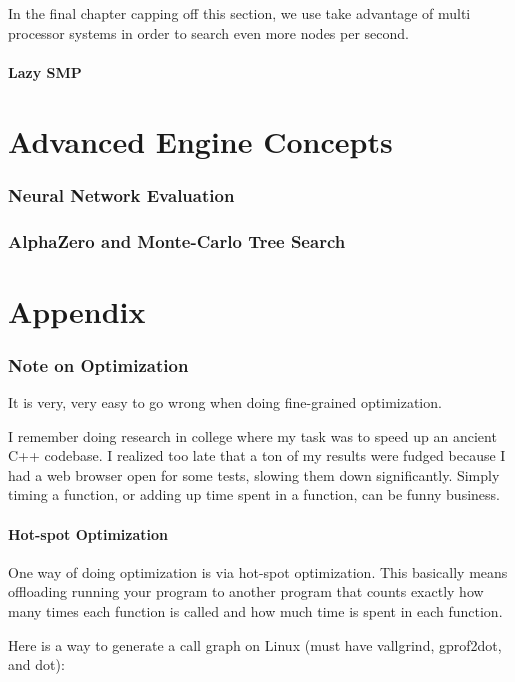 \documentclass[letterpaper,11pt]{article}
\begin{document}
In the final chapter capping off this section, we use take advantage of multi processor systems in order to 
search even more nodes per second.

\subsection{Lazy SMP}

\newpage
\part{Advanced Engine Concepts}

\section{Neural Network Evaluation}

\section{AlphaZero and Monte-Carlo Tree Search}

\newpage
\part{Appendix}
\section{Note on Optimization}

It is very, very easy to go wrong when doing fine-grained optimization.

I remember doing research in college where my task was to speed up an ancient C++ codebase. I realized too late that a ton of my results were fudged because I had a web browser open for some tests, slowing them down significantly. Simply timing a function, or adding up time spent in a function, can be funny business.

\subsection{Hot-spot Optimization}

One way of doing optimization is via hot-spot optimization. This basically means offloading running your program to another program that counts exactly how many times each function is called and how much time is spent in each function.

Here is a way to generate a call graph on Linux (must have vallgrind, gprof2dot, and dot):
\end{document}
